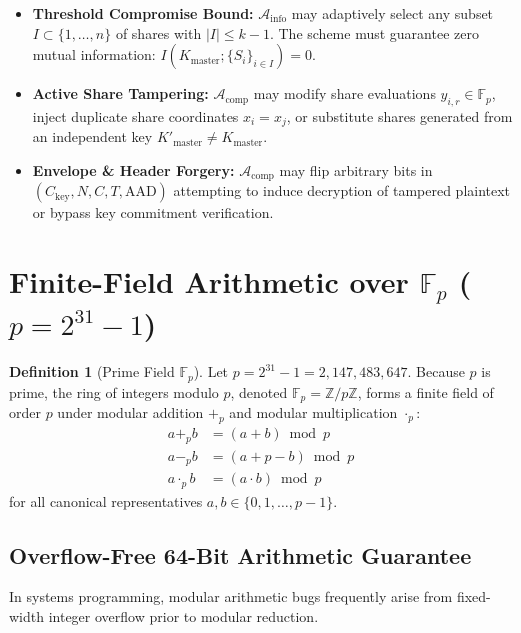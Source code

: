 \documentclass[11pt,a4paper]{article}
\theoremstyle{definition}
\newtheorem{definition}[section]{Definition}
\newcommand{\Fp}{\mathbb{F}_p}
\newcommand{\Z}{\mathbb{Z}}
\begin{document}
\begin{itemize}
    \item \textbf{Threshold Compromise Bound:} $\mathcal{A}_{\mathrm{info}}$ may adaptively select any subset $I \subset \{1, \dots, n\}$ of shares with $|I| \le k - 1$. The scheme must guarantee zero mutual information: $I(K_{\mathrm{master}}; \{S_i\}_{i \in I}) = 0$.
    \item \textbf{Active Share Tampering:} $\mathcal{A}_{\mathrm{comp}}$ may modify share evaluations $y_{i,r} \in \Fp$, inject duplicate share coordinates $x_i = x_j$, or substitute shares generated from an independent key $K'_{\mathrm{master}} \neq K_{\mathrm{master}}$.
    \item \textbf{Envelope & Header Forgery:} $\mathcal{A}_{\mathrm{comp}}$ may flip arbitrary bits in $(C_{\mathrm{key}}, N, C, T, \mathrm{AAD})$ attempting to induce decryption of tampered plaintext or bypass key commitment verification.
\end{itemize}

\section{Finite-Field Arithmetic over $\Fp$ ($p = 2^{31} - 1$)}

\begin{definition}[Prime Field $\Fp$]
Let $p = 2^{31} - 1 = 2,147,483,647$. Because $p$ is prime, the ring of integers modulo $p$, denoted $\Fp = \Z / p\Z$, forms a finite field of order $p$ under modular addition $+_p$ and modular multiplication $\cdot_p$:
\begin{align}
    a +_p b &= (a + b) \bmod p \\
    a -_p b &= (a + p - b) \bmod p \\
    a \cdot_p b &= (a \cdot b) \bmod p
\end{align}
for all canonical representatives $a, b \in \{0, 1, \dots, p-1\}$.
\end{definition}

\subsection{Overflow-Free 64-Bit Arithmetic Guarantee}
In systems programming, modular arithmetic bugs frequently arise from fixed-width integer overflow prior to modular reduction.
\end{document}
